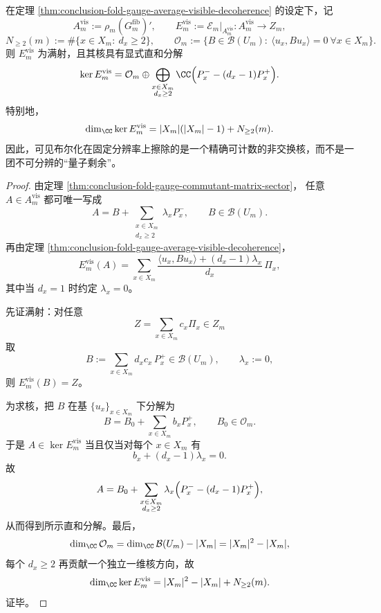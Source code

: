 \begin{theorem}[可见布尔化核的显式分解与精确维数]\label{thm:conclusion-fold-quantum-visible-kernel-explicit-decomposition}
在定理 \ref{thm:conclusion-fold-gauge-average-visible-decoherence} 的设定下，记
\[
A_m^{\mathrm{vis}}:=\rho_m(G_m^{\mathrm{fib}})',
\qquad
E_m^{\mathrm{vis}}:=\mathcal E_m|_{A_m^{\mathrm{vis}}}:A_m^{\mathrm{vis}}\to Z_m,
\]
\[
N_{\ge 2}(m):=\#\{x\in X_m:\ d_x\ge 2\},
\qquad
\mathcal O_m:=\{B\in \mathcal B(U_m):\ \langle u_x,Bu_x\rangle=0\ \forall x\in X_m\}.
\]
则 \(E_m^{\mathrm{vis}}\) 为满射，且其核具有显式直和分解
\[
\ker E_m^{\mathrm{vis}}
=
\mathcal O_m
\oplus
\bigoplus_{\substack{x\in X_m\\ d_x\ge 2}}
\CC\Bigl(P_x^--(d_x-1)P_x^+\Bigr).
\]
特别地，
\[
\dim_{\CC}\ker E_m^{\mathrm{vis}}
=
|X_m|(|X_m|-1)+N_{\ge 2}(m).
\]
因此，可见布尔化在固定分辨率上擦除的是一个精确可计数的非交换核，而不是一团不可分辨的“量子剩余”。
\end{theorem}
\begin{proof}
由定理 \ref{thm:conclusion-fold-gauge-commutant-matrix-sector}，
任意 \(A\in A_m^{\mathrm{vis}}\) 都可唯一写成
\[
A=B+\sum_{\substack{x\in X_m\\ d_x\ge 2}}\lambda_xP_x^-,
\qquad
B\in\mathcal B(U_m).
\]
再由定理 \ref{thm:conclusion-fold-gauge-average-visible-decoherence}，
\[
E_m^{\mathrm{vis}}(A)
=
\sum_{x\in X_m}
\frac{\langle u_x,Bu_x\rangle+(d_x-1)\lambda_x}{d_x}\,\Pi_x,
\]
其中当 \(d_x=1\) 时约定 \(\lambda_x=0\)。

先证满射：对任意
\[
Z=\sum_{x\in X_m}c_x\Pi_x\in Z_m
\]
取
\[
B:=\sum_{x\in X_m}d_xc_x\,P_x^+\in \mathcal B(U_m),
\qquad
\lambda_x:=0,
\]
则 \(E_m^{\mathrm{vis}}(B)=Z\)。

为求核，把 \(B\) 在基 \(\{u_x\}_{x\in X_m}\) 下分解为
\[
B=B_0+\sum_{x\in X_m}b_xP_x^+,
\qquad
B_0\in\mathcal O_m.
\]
于是 \(A\in\ker E_m^{\mathrm{vis}}\) 当且仅当对每个 \(x\in X_m\) 有
\[
b_x+(d_x-1)\lambda_x=0.
\]
故
\[
A
=
B_0+\sum_{\substack{x\in X_m\\ d_x\ge 2}}\lambda_x\Bigl(P_x^--(d_x-1)P_x^+\Bigr),
\]
从而得到所示直和分解。最后，
\[
\dim_{\CC}\mathcal O_m
=
\dim_{\CC}\mathcal B(U_m)-|X_m|
=
|X_m|^2-|X_m|,
\]
每个 \(d_x\ge 2\) 再贡献一个独立一维核方向，故
\[
\dim_{\CC}\ker E_m^{\mathrm{vis}}
=
|X_m|^2-|X_m|+N_{\ge 2}(m).
\]
证毕。
\end{proof}
